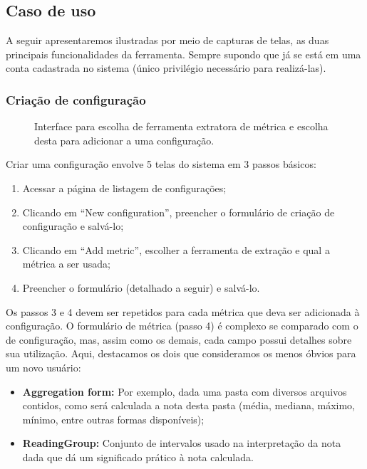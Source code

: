 \documentclass[12pt]{article}
\begin{document}
  \subsection{Caso de uso}
  A seguir apresentaremos ilustradas por meio de capturas de telas, as duas principais funcionalidades da ferramenta. Sempre supondo que já se está em uma conta cadastrada no sistema (único privilégio necessário para realizá-las).

    \subsubsection{Criação de configuração}
    \begin{figure}[ht]
      \centering
      \caption{Interface para escolha de ferramenta extratora de métrica e escolha desta para adicionar a uma configuração.}
      \label{fig:choose-metric}
    \end{figure}

    Criar uma configuração envolve 5 telas do sistema em 3 passos básicos:
    \begin{enumerate}
      \item Acessar a página de listagem de configurações;
      \item Clicando em ``New configuration'', preencher o formulário de criação de configuração e salvá-lo;
      \item Clicando em ``Add metric'', escolher a ferramenta de extração e qual a métrica a ser usada;
      \item Preencher o formulário (detalhado a seguir) e salvá-lo.
    \end{enumerate}

    Os passos 3 e 4 devem ser repetidos para cada métrica que deva ser adicionada à configuração. O formulário de métrica (passo 4) é complexo se comparado com o de configuração, mas, assim como os demais, cada campo possui detalhes sobre sua utilização. Aqui, destacamos os dois que consideramos os menos óbvios para um novo usuário:
    \begin{itemize}
      \item \textbf{Aggregation form:} Por exemplo, dada uma pasta com diversos arquivos contidos, como será calculada a nota desta pasta (média, mediana, máximo, mínimo, entre outras formas disponíveis);
      \item \textbf{ReadingGroup:} Conjunto de intervalos usado na interpretação da nota dada que dá um significado prático à nota calculada.
    \end{itemize}
\end{document}
